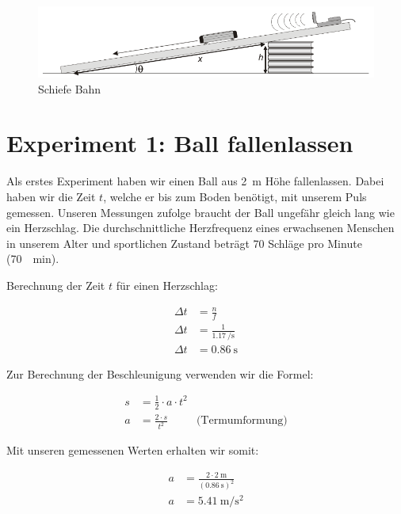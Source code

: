 \documentclass[a4paper, titlepage]{article}
\newcommand{\accunit}[1]{\SI{#1}{\metre\per\square\second}}
\begin{document}
    \begin{figure}
        \includegraphics[width=\textwidth]{images/incline.png}
        \caption{Schiefe Bahn}
        \label{incline}
    \end{figure}

    \section{Experiment 1: Ball fallenlassen}
    Als erstes Experiment haben wir einen Ball aus \SI{2}{\metre} Höhe
    fallenlassen. Dabei haben wir die Zeit $t$, welche er bis zum Boden
    benötigt, mit unserem Puls gemessen. Unseren Messungen zufolge
    braucht der Ball ungefähr gleich lang wie ein Herzschlag. Die
    durchschnittliche Herzfrequenz eines erwachsenen Menschen in unserem
    Alter und sportlichen Zustand beträgt 70 Schläge pro Minute (\SI{70}{\per\minute}).

    Berechnung der Zeit $t$ für einen Herzschlag:
    
    \begin{align}
        \Delta t &= \frac{n}{f} \\
        \Delta t &= \frac{1}{\SI{1.17}{\per\second}} \\
        \Delta t &= \SI{0.86}{\second}
    \end{align}

    Zur Berechnung der Beschleunigung verwenden wir
    die Formel:

    \begin{align}
        s &= \frac{1}{2} \cdot a \cdot t^2 \\
        a &= \frac{2 \cdot s}{t^2} & \text{(Termumformung)}
    \end{align}

    Mit unseren gemessenen Werten erhalten wir somit:

    \begin{align}
        a &= \frac{2 \cdot \SI{2}{\metre}}{(\SI{0.86}{\second})^2} \\
        a &= \accunit{5.41}
    \end{align}
\end{document}
